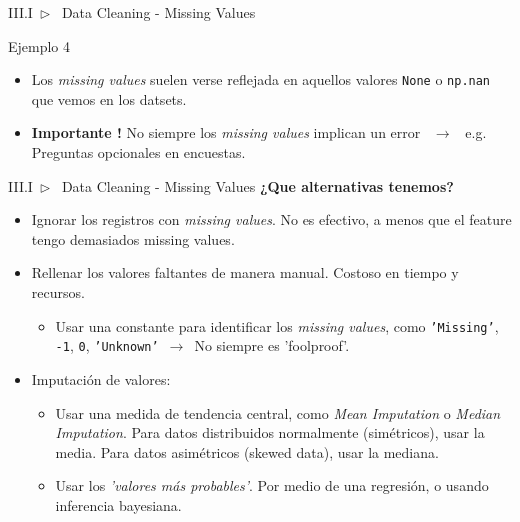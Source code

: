 \documentclass[xcolor=dvipsnames]{beamer}
\begin{document}
    \begin{frame}[fragile]{III.I~$\rhd$~ Data Cleaning - Missing Values}
        \begin{exampleblock}{Ejemplo 4}
        
        \end{exampleblock}
        \vspace{3mm}
        \begin{itemize}
            \item Los \textit{missing values} suelen verse reflejada en aquellos valores \texttt{None} o \texttt{np.nan} que vemos en los datsets.
            \item \textbf{Importante !} No siempre los \textit{missing values} implican un error ~$\rightarrow$~ e.g. Preguntas opcionales en encuestas.
        \end{itemize}
    \end{frame}

    \begin{frame}[fragile]{III.I~$\rhd$~ Data Cleaning - Missing Values}
        \textbf{¿Que alternativas tenemos?}
        \vspace{3mm}
        \begin{itemize}
            \item Ignorar los registros con \textit{missing values}. No es efectivo, a menos que el feature tengo demasiados missing values.
            \item Rellenar los valores faltantes de manera manual. Costoso en tiempo y recursos.
            \begin{itemize}
                \item Usar una constante para identificar los \textit{missing values}, como \texttt{'Missing'}, \texttt{-1}, \texttt{0}, \texttt{'Unknown'}~$\rightarrow$~No siempre es 'foolproof'.
            \end{itemize}
            \vspace{3mm}%
            \item Imputación de valores:
            \begin{itemize}
                \item Usar una medida de tendencia central, como \textit{Mean Imputation} o \textit{Median Imputation}. Para datos distribuidos normalmente (simétricos), usar la media. Para datos asimétricos (skewed data), usar la mediana.
                \item Usar los \textit{'valores más probables'}. Por medio de una regresión, o usando inferencia bayesiana.
            \end{itemize}
        \end{itemize}
    \end{frame}
\end{document}

